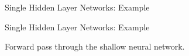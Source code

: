 \begin{frame} {Single Hidden Layer Networks: Example}
\begin{itemize}
\begin{figure}
  \end{figure}
  \begin{figure}
    \centering
  \end{figure}
  \end{itemize}
\end{frame}

\begin{frame} {Single Hidden Layer Networks: Example}
  
  \small{Forward pass through the shallow neural network.}
  \begin{figure}
    \centering

\end{figure}
\end{frame}
